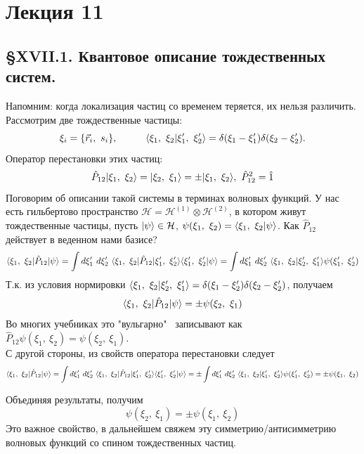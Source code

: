 \section{Лекция 11}
\subsection{\S XVII.1. Квантовое описание тождественных систем.}
Напомним: когда локализация частиц со временем теряется, их нельзя различить. Рассмотрим две тождественные частицы:
\[
\xi_i = \{\vec{r}_i,~s_i\}, \hspace*{1cm} \langle \xi_1,~\xi_2 | \xi_1',~\xi_2' \rangle = \delta(\xi_1 - \xi_1')\delta(\xi_2 - \xi_2').
\]
Оператор перестановки этих частиц:
\[
\hat{P}_{12}| \xi_1,~\xi_2 \rangle = | \xi_2,~\xi_1 \rangle = \pm| \xi_1,~\xi_2 \rangle, \ \hat{P}_{12}^2 = \hat{1}
\]
Поговорим об описании такой системы в терминах волновых функций. У нас есть гильбертово пространство $\mathcal{H} = \mathcal{H}^{(1)}\otimes\mathcal{H}^{(2)}$, в котором живут тождественные частицы, пусть $| \psi \rangle\in\mathcal{H}$, $\psi(\xi_1,~\xi_2) = \langle \xi_1,~\xi_2 | \psi \rangle$. Как $\hat{P}_{12}$ действует в веденном нами базисе?
\[
\langle \xi_1,~\xi_2 | \hat{P}_{12} | \psi \rangle = \int d\xi_1'~d\xi_2'~\langle \xi_1,~\xi_2 | \hat{P}_{12} | \xi_1',~\xi_2' \rangle\langle \xi_1',~\xi_2' | \psi \rangle = \int d\xi_1'~d\xi_2'~\langle \xi_1,~\xi_2 | \xi_2',~\xi_1' \rangle\psi(\xi_1',~\xi_2')
\]
Т.к. из условия нормировки $\langle \xi_1,~\xi_2 | \xi_2',~\xi_1' \rangle = \delta(\xi_1 - \xi_2')\delta(\xi_2 -\xi_2')$, получаем
\[
\langle \xi_1,~\xi_2 | \hat{P}_{12} | \psi \rangle = \pm \psi(\xi_2,~\xi_1)
\]
Во многих учебниках это "вульгарно" \ записывают как $\hat{P}_{12} \psi(\xi_1,~\xi_2) = \psi(\xi_2,~\xi_1)$.\\

С другой стороны, из свойств оператора перестановки следует
\[
\langle \xi_1,~\xi_2 | \hat{P}_{12} | \psi \rangle = \int d\xi_1'~d\xi_2'~\langle \xi_1,~\xi_2 | \hat{P}_{12} | \xi_1',~\xi_2' \rangle\langle \xi_1',~\xi_2' | \psi \rangle = \pm \int d\xi_1'~d\xi_2'~\langle \xi_1,~\xi_2 | \xi_1',~\xi_2' \rangle\psi(\xi_1',~\xi_2') = \pm \psi(\xi_1,~\xi_2)
\]

Объединяя результаты, получим
\[
\psi(\xi_2,~\xi_1) = \pm\psi(\xi_1,~\xi_2)
\]
Это важное свойство, в дальнейшем свяжем эту симметрию/антисимметрию волновых функций со спином тождественных частиц.\\

